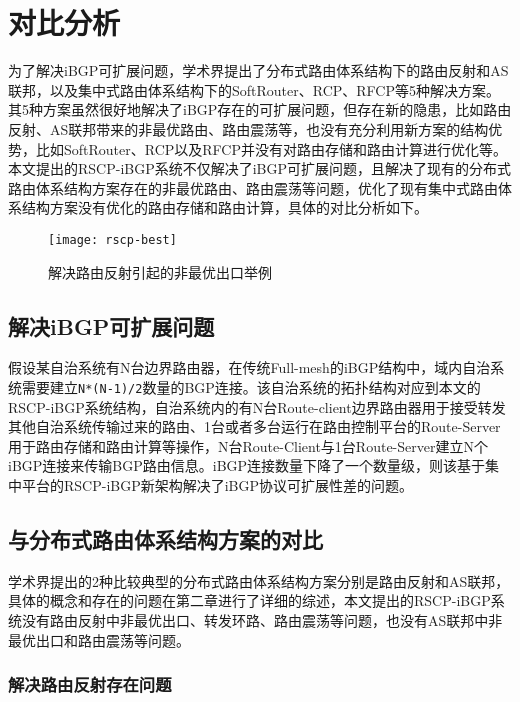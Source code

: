 \section{对比分析}

为了解决iBGP可扩展问题，学术界提出了分布式路由体系结构下的路由反射和AS联邦，以及集中式路由体系结构下的SoftRouter、RCP、RFCP等5种解决方案。其5种方案虽然很好地解决了iBGP存在的可扩展问题，但存在新的隐患，比如路由反射、AS联邦带来的非最优路由、路由震荡等，也没有充分利用新方案的结构优势，比如SoftRouter、RCP以及RFCP并没有对路由存储和路由计算进行优化等。本文提出的RSCP-iBGP系统不仅解决了iBGP可扩展问题，且解决了现有的分布式路由体系结构方案存在的非最优路由、路由震荡等问题，优化了现有集中式路由体系结构方案没有优化的路由存储和路由计算，具体的对比分析如下。

\begin{figure}
  \centering
  \texttt{[image: rscp-best]}
  \caption{解决路由反射引起的非最优出口举例}
  \label{fig:rscp-best}
\end{figure}


\subsection{解决iBGP可扩展问题}

假设某自治系统有N台边界路由器，在传统Full-mesh的iBGP结构中，域内自治系统需要建立\verb+N*(N-1)/2+数量的BGP连接。该自治系统的拓扑结构对应到本文的RSCP-iBGP系统结构，自治系统内的有N台Route-client边界路由器用于接受转发其他自治系统传输过来的路由、1台或者多台运行在路由控制平台的Route-Server用于路由存储和路由计算等操作，N台Route-Client与1台Route-Server建立N个iBGP连接来传输BGP路由信息。iBGP连接数量下降了一个数量级，则该基于集中平台的RSCP-iBGP新架构解决了iBGP协议可扩展性差的问题。

\subsection{与分布式路由体系结构方案的对比}

学术界提出的2种比较典型的分布式路由体系结构方案分别是路由反射和AS联邦，具体的概念和存在的问题在第二章进行了详细的综述，本文提出的RSCP-iBGP系统没有路由反射中非最优出口、转发环路、路由震荡等问题，也没有AS联邦中非最优出口和路由震荡等问题。

\subsubsection{解决路由反射存在问题}



